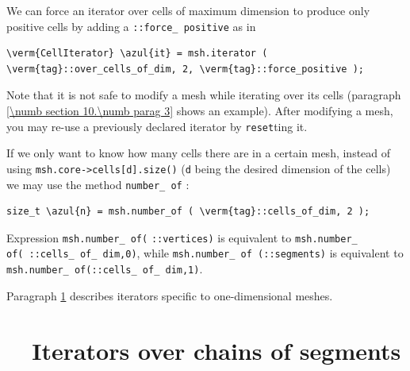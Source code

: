 We can force an iterator over cells of maximum dimension to produce only positive cells
by adding a {\small\tt {}::force\_\,positive} as in

\begin{Verbatim}[commandchars=\\\{\},formatcom=\small\tt,
   baselinestretch=0.94,framesep=2mm                      ]
   \verm{CellIterator} \azul{it} = msh.iterator ( \verm{tag}::over_cells_of_dim, 2, \verm{tag}::force_positive );
\end{Verbatim}

Note that it is not safe to modify a mesh while iterating over its cells
(paragraph \ref{\numb section 10.\numb parag 3} shows an example).
After modifying a mesh, you may re-use a previously declared iterator by {\small\tt reset}ting it.

If we only want to know how many cells there are in a certain mesh,
instead of using {\small\tt msh.core->cells[d].size()} ({\small\tt d} being the desired
dimension of the cells) we may use the method {\small\tt number\_\,of} :

\begin{Verbatim}[commandchars=\\\{\},formatcom=\small\tt,
   baselinestretch=0.94,framesep=2mm                      ]
   size_t \azul{n} = msh.number_of ( \verm{tag}::cells_of_dim, 2 );
\end{Verbatim}

\noindent Expression {\small\tt msh.number\_\,of}\hskip1pt{\small\tt (}\hskip1pt
{\small\tt {}::vertices}\hskip1pt{\small\tt )} is equivalent to
\hbox{{\small\tt msh.number\_\,of}\hskip1pt{\small\tt (}\hskip1pt
{\small\tt {}::cells\_\,of\_\,dim,}\hskip1pt{\small\tt 0}\hskip1pt{\small\tt )}},
while {\small\tt msh.number\_\,of}\hskip2pt{\small\tt
(}\hskip2pt{\small\tt {}::segments}\hskip2pt{\small\tt )} is equivalent to
{\small\tt msh.number\_\,of}\hskip2pt{\small\tt (}\hskip2pt{\small\tt {}::cells\_\,of\_\,dim,}\hskip2pt{\small\tt 1}\hskip2pt{\small\tt )}.

Paragraph \ref{\numb section 9.\numb parag 6} describes iterators specific to one-dimensional
meshes.


\section{~~Iterators over chains of segments}\label{\numb section 9.\numb parag 6}

